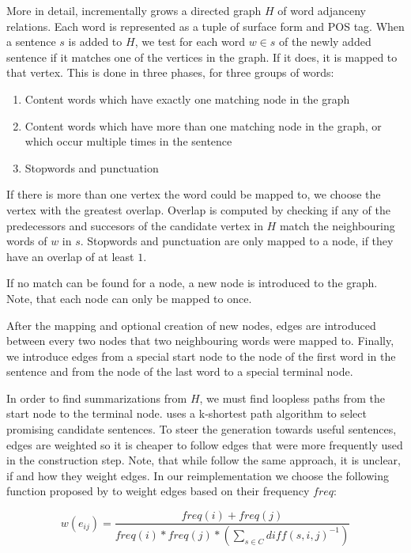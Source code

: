 \documentclass[a4paper,BCOR=10mm]{report}
\numberwithin{lemma}{chapter}
\numberwithin{definition}{chapter}
\begin{document}
More in detail, \citeauthor{filippova} incrementally grows a directed graph $H$ of word adjanceny relations. Each word is represented as a tuple of surface form and POS tag. When a sentence $s$ is added to $H$, we test for each word $w \in s$ of the newly added sentence if it matches one of the vertices in the graph. If it does, it is mapped to that vertex. This is done in three phases, for three groups of words:

\begin{enumerate}
\item{Content words which have exactly one matching node in the graph}
\item{Content words which have more than one matching node in the graph, or which occur multiple times in the sentence}
\item{Stopwords and punctuation} %
\end{enumerate}

If there is more than one vertex the word could be mapped to, we choose the vertex with the greatest overlap. Overlap is computed by checking if any of the predecessors and succesors of the candidate vertex in $H$ match the neighbouring words of $w$ in $s$.
Stopwords and punctuation are only mapped to a node, if they have an overlap of at least $1$.

If no match can be found for a node, a new node is introduced to the graph. Note, that each node can only be mapped to once.

After the mapping and optional creation of new nodes, edges are introduced between every two nodes that two neighbouring words were mapped to.
Finally, we introduce edges from a special start node to the node of the first word in the sentence and from the node of the last word to a special terminal node.

In order to find summarizations from $H$, we must find loopless paths from the start node to the terminal node. \citet{filippova} uses a k-shortest path algorithm to select promising candidate sentences. To steer the generation towards useful sentences, edges are weighted so it is cheaper to follow edges that were more frequently used in the construction step. Note, that while \citeauthor{banerjee} follow the same approach, it is unclear, if and how they weight edges.
In our reimplementation we choose the following function proposed by \citeauthor{filippova} to weight edges based on their frequency $\mathit{freq}$:

\begin{equation}
w(e_{ij}) = \frac{\mathit{freq}(i) + \mathit{freq}(j)} {\mathit{freq}(i) * \mathit{freq}(j) * (\sum_{s \in C} \mathit{diff}(s, i, j)^{-1})}
\end{equation}
\end{document}
